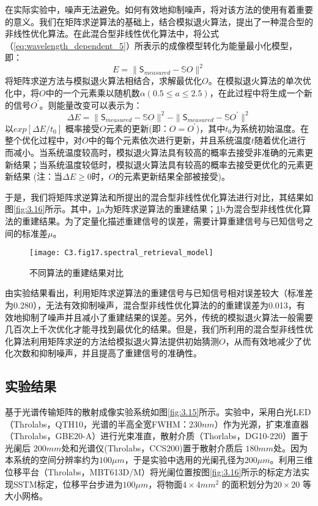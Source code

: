 在实际实验中，噪声无法避免。如何有效地抑制噪声，将对该方法的使用有着重要的意义。我们在矩阵求逆算法的基础上，结合模拟退火算法，提出了一种混合型的非线性优化算法。在此混合型非线性优化算法中，将公式（\ref{eq:wavelength_dependent_5}）所表示的成像模型转化为能量最小化模型，即：
\begin{equation}
  E = \| \mathsf{S_{\textit{measured}}}-\mathbb{S}O \|^2
\label{eq:wavelength_dependent_6}
\end{equation}
将矩阵求逆方法与模拟退火算法相结合，求解最优化$O$。在模拟退火算法的单次优化中，将$O$中的一个元素乘以随机数$\alpha (0.5≤a≤2.5)$，在此过程中将生成一个新的信号$O^{\prime}$。则能量改变可以表示为：
\begin{equation}
  \Delta E = \| \mathsf{S_{\textit{measured}}}-\mathbb{S}O \|^2-\| \mathsf{S_{\textit{measured}}}-\mathbb{S}O^{\prime} \|^2
\label{eq:wavelength_dependent_7}
\end{equation}
以$exp[ \Delta E / t_0]$ 概率接受$O$元素的更新(即：$O = O^{\prime}$)，其中$t_0$为系统初始温度。在整个优化过程中，对$O$中的每个元素依次进行更新，并且系统温度$t$随着优化进行而减小。当系统温度较高时，模拟退火算法具有较高的概率去接受非准确的元素更新结果；当系统温度较低时，模拟退火算法具有较高的概率去接受更优化的元素更新结果 (注：当$\Delta E \ge 0 $时，$O$的元素更新结果全部被接受)。

于是，我们将矩阵求逆算法和所提出的混合型非线性优化算法进行对比，其结果如图\ref{fig:3.16}所示。其中，\ref{fig:3.17}a为矩阵求逆算法的重建结果；\ref{fig:3.17}b为混合型非线性优化算法的重建结果。为了定量化描述重建信号的误差，需要计算重建信号与已知信号之间的标准差$\mu$。

\begin{figure}[htp]
	\centering
	\texttt{[image: C3.fig17.spectral\_retrieval\_model]}
	\caption{不同算法的重建结果对比}
	\label{fig:3.17}
\end{figure}

由实验结果看出，利用矩阵求逆算法的重建信号与已知信号相对误差较大（标准差为0.280），无法有效抑制噪声，混合型非线性优化算法的的重建误差为0.013，有效地抑制了噪声并且减小了重建结果的误差。另外，传统的模拟退火算法一般需要几百次上千次优化才能寻找到最优化的结果。但是，我们所利用的混合型非线性优化算法利用矩阵求逆的方法给模拟退火算法提供初始猜测$O$，从而有效地减少了优化次数和抑制噪声，并且提高了重建信号的准确性。
\subsection{实验结果}
基于光谱传输矩阵的散射成像实验系统如图\ref{fig:3.15}所示。实验中，采用白光LED（Throlabs，QTH10，光谱的半高全宽FWHM：$230 nm$）作为光源，扩束准直器（Throlabs，GBE20-A）进行光束准直，散射介质（Thorlabs，DG10-220）置于光阑后 $200 mm$处和光谱仪(Throlabs，CCS200)置于散射介质后 $180 mm$处。因为本系统的空间分辨率约为$100 \mu m$，于是实验中选用的光阑孔径为$200 \mu m$。利用三维位移平台（Throlabs，MBT613D/M）将光阑位置按图\ref{fig:3.16}所示的标定方法实现SSTM标定，位移平台步进为$100 \mu m$，将物面$ 4\times 4 mm^2$ 的面积划分为$ 20\times 20$ 等大小网格。

